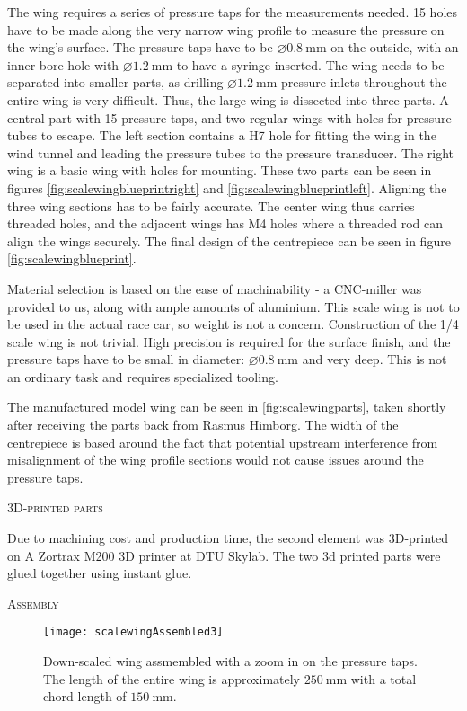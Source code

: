       The wing requires a series of pressure taps for the measurements needed. 15 holes have to be made along the very narrow wing profile to measure the pressure on the wing's surface. The pressure taps have to be $\diameter\SI{0.8}{\milli\metre}$ on the outside, with an inner bore hole with $\diameter\SI{1.2}{\milli\metre}$ to have a syringe inserted. The wing needs to be separated into smaller parts, as drilling $\diameter\SI{1.2}{\milli\metre}$ pressure inlets throughout the entire wing is very difficult. Thus, the large wing is dissected into three parts. A central part with 15 pressure taps, and two regular wings with holes for pressure tubes to escape. The left section contains a H7 hole for fitting the wing in the wind tunnel and leading the pressure tubes to the pressure transducer. The right wing is a basic wing with holes for mounting. These two parts can be seen in figures \ref{fig:scalewingblueprintright} and \ref{fig:scalewingblueprintleft}. Aligning the three wing sections has to be fairly accurate. The center wing thus carries threaded holes, and the adjacent wings has M4 holes where a threaded rod can align the wings securely. The final design of the centrepiece can be seen in figure \ref{fig:scalewingblueprint}.

      Material selection is based on the ease of machinability - a CNC-miller was provided to us, along with ample amounts of aluminium. This scale wing is not to be used in the actual race car, so weight is not a concern. Construction of the 1/4 scale wing is not trivial. High precision is required for the surface finish, and the pressure taps have to be small in diameter: $\diameter\SI{0.8}{\milli\metre}$ and very deep. This is not an ordinary task and requires specialized tooling.

      The manufactured model wing can be seen in \ref{fig:scalewingparts}, taken shortly after receiving the parts back from Rasmus Himborg. The width of the centrepiece is based around the fact that potential upstream interference from misalignment of the wing profile sections would not cause issues around the pressure taps. %

      \textsc{3D-printed parts}

        Due to machining cost and production time, the second element was 3D-printed on A Zortrax M200 3D printer at DTU Skylab. The two 3d printed parts were glued together using instant glue.

      \textsc{Assembly}

      \begin{figure}
        \texttt{[image: scalewingAssembled3]}
        \caption{Down-scaled wing assmembled with a zoom in on the pressure taps. The length of the entire wing is approximately $\SI{250}{\milli\metre}$ with a total chord length of $\SI{150}{\milli\metre}$.}
        \label{fig:scalewing}
      \end{figure}


